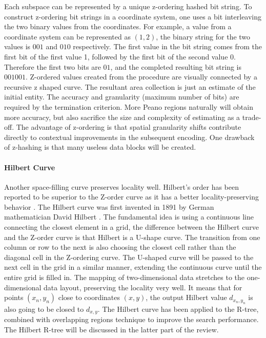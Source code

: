 Each subspace can be represented by a unique z-ordering hashed bit string. To construct z-ordering bit strings in a coordinate system, one uses a bit interleaving the two binary values from the coordinates. For example, a value from a coordinate system can be represented as $(1, 2)$, the binary string for the two values is $001$ and $010$ respectively. The first value in the bit string comes from the first bit of the first value 1, followed by the first bit of the second value $0$. Therefore the first two bits are $01$, and the completed resulting bit string is $001001$. Z-ordered values created from the procedure are visually connected by a recursive z shaped curve. The resultant area collection is just an estimate of the initial entity. The accuracy and granularity (maximum number of bits) are required by the termination criterion. More Peano regions naturally will obtain more accuracy, but also sacrifice the size and complexity of estimating as a trade-off. The advantage of z-ordering is that spatial granularity shifts contribute directly to contextual improvements in the subsequent encoding. One drawback of z-hashing is that many useless data blocks will be created.

\paragraph{Hilbert Curve}
Another space-filling curve preserves locality well. Hilbert's order has been reported to be superior to the  Z-order curve as it has a better locality-preserving behavior \cite{Faloutsos:1991ue}. The Hilbert curve was first invented in 1891 by German mathematician David Hilbert \cite{hilbert1935stetige}. The fundamental idea is using a continuous line connecting the closest element in a grid, the difference between the Hilbert curve and the Z-order curve is that Hilbert is a U-shape curve. The transition from one column or row to the next is also choosing the closest cell rather than the diagonal cell in the Z-ordering curve. The U-shaped curve will be passed to the next cell in the grid in a similar manner, extending the continuous curve until the entire grid is filled in. The mapping of two-dimensional data stretches to the one-dimensional data layout, preserving the locality very well. It means that for points ${(x_n, y_n)}$ close to coordinates ${(x, y)}$, the output Hilbert value ${d_{x_n, y_n}}$ is also going to be closed to ${d_{x,y}}$. The Hilbert curve has been applied to the R-tree, combined with overlapping regions technique to improve the search performance. The Hilbert R-tree will be discussed in the latter part of the review. 



